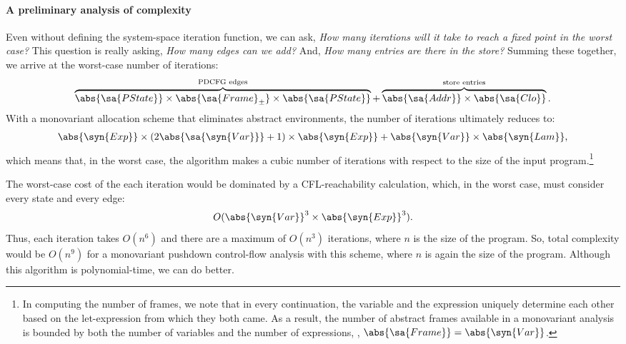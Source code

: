 \paragraph{A preliminary analysis of complexity}
Even without defining the system-space iteration function, we can ask,
\emph{How many iterations will it take to reach a fixed point in the worst
case?}
This question is really asking, \emph{How many edges can we add?}
And, \emph{How many entries are there in the store?}
Summing these together, we arrive at the worst-case number of
iterations:
\begin{align*}
  \overbrace{\abs{\sa{PState}}
  \times
  \abs{\sa{Frame}_\pm}
  \times
  \abs{\sa{PState}}}^{\text{PDCFG edges}}
  +
  \overbrace{
    \abs{\sa{Addr}}
    \times
    \abs{\sa{Clo}}
  }^{\text{store entries}}
  \text.
\end{align*}
With a monovariant allocation scheme that eliminates abstract environments, the number of iterations
ultimately reduces to:
\begin{align*}
  \abs{\syn{Exp}}
  \times (2 \abs{\sa{\syn{Var}}} + 1)
  \times \abs{\syn{Exp}}
  +
  \abs{\syn{Var}}
  \times \abs{\syn{Lam}}
  \text,
\end{align*}
which means that, in the worst case, the algorithm makes a cubic
number of iterations with respect to the size of the input
program.\footnote{In computing the number of frames, we note that in
  every continuation, the variable and the expression uniquely
  determine each other based on the let-expression from which they
  both came.
As a result, the number of abstract frames available in a
  monovariant analysis is bounded by both the number of variables and
  the number of expressions, \ie, $\abs{\sa{Frame}} =
  \abs{\syn{Var}}$.}

The worst-case cost of the each iteration would be dominated by a
CFL-reachability calculation, which, in the worst case, must consider
every state and every edge:
\begin{equation*}
  O(\abs{\syn{Var}}^3 \times \abs{\syn{Exp}}^3)
  \text.
\end{equation*}
Thus, each iteration takes $O(n^{6})$ and there are a maximum of $O(n^{3})$ iterations, where $n$ is the size of the program.
So, total complexity would be $O(n^{9})$ for a monovariant
pushdown control-flow analysis with this scheme, where $n$ is again the size of the program.
Although this algorithm is polynomial-time, we can do better.



